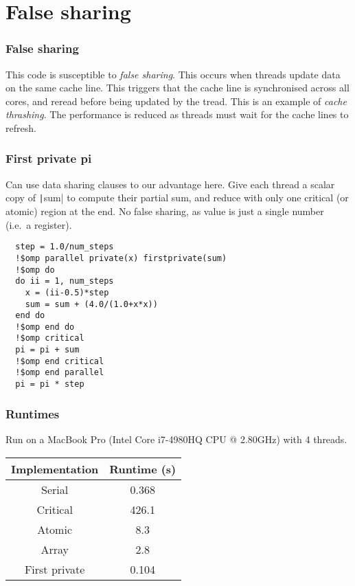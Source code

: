 \documentclass{beamer}
\begin{document}
\section{False sharing}
\begin{frame}
\frametitle{False sharing}
This code is susceptible to \emph{false sharing}.
This occurs when threads update data on the same cache line.
This triggers that the cache line is synchronised across all cores, and reread before being updated by the tread.
This is an example of \emph{cache thrashing}.
The performance is reduced as threads must wait for the cache lines to refresh.
\end{frame}

\begin{frame}[fragile]
\frametitle{First private pi}
Can use data sharing clauses to our advantage here. Give each thread a scalar copy of \texttt|sum| to compute their partial sum, and reduce with only one critical (or atomic) region at the end.
No false sharing, as value is just a single number (i.e.\ a register).
\begin{verbatim}
  step = 1.0/num_steps
  !$omp parallel private(x) firstprivate(sum)
  !$omp do
  do ii = 1, num_steps
    x = (ii-0.5)*step
    sum = sum + (4.0/(1.0+x*x))
  end do
  !$omp end do
  !$omp critical
  pi = pi + sum
  !$omp end critical
  !$omp end parallel
  pi = pi * step
\end{verbatim}
\end{frame}

\begin{frame}
\frametitle{Runtimes}
Run on a MacBook Pro (Intel Core i7-4980HQ CPU @ 2.80GHz) with 4 threads.

\begin{table}
\begin{tabular}{cc}
\toprule
Implementation & Runtime (s) \\
\midrule
Serial        & 0.368 \\
Critical      & 426.1 \\
Atomic        & 8.3 \\
Array         & 2.8 \\
First private & 0.104 \\
\bottomrule
\end{tabular}
\end{table}
\end{frame}
\end{document}
